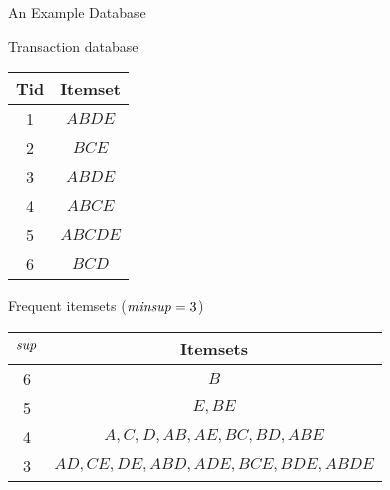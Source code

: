 \begin{frame}{An Example Database}
\begin{footnotesize}
\begin{minipage}{1.5in}
\begin{center}
Transaction database \\[0.5cm]

  \centering
\begin{tabular}{|c|c|}
  \hline
  Tid & Itemset\\
\hline
1 & $\mathit{ABDE}$\\
2 & $\mathit{BCE}$\\
3 & $\mathit{ABDE}$\\
4 & $\mathit{ABCE}$\\
5 & $\mathit{ABCDE}$\\
6 & $\mathit{BCD}$\\
\hline
\end{tabular}
\end{center}
\end{minipage}
\hspace{0.1in} 
\begin{minipage}{6cm}
\begin{center}
Frequent itemsets ($\mathit{minsup} = 3$) \\[0.5cm]

\begin{tabular}{|c|c|}
\hline
$\mathit{sup}$ & Itemsets\\
\hline
6 & $B$\\
5 & $E, \mathit{BE}$\\
4 & $A, C, D, \mathit{AB}, \mathit{AE}, \mathit{BC}, \mathit{BD}, \mathit{ABE}$\\
3 &  $\mathit{AD}, \mathit{CE}, \mathit{DE}, \mathit{ABD}, \mathit{ADE}, \mathit{BCE}, \mathit{BDE}, \mathit{ABDE}$\\
\hline
\end{tabular}
\end{center}
\end{minipage}
\end{footnotesize}
\end{frame}


